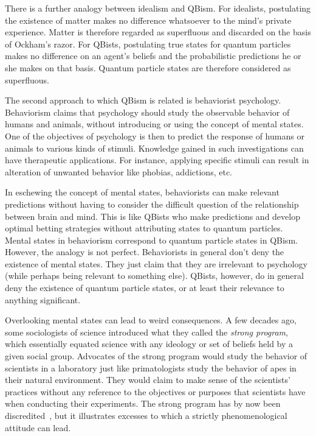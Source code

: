 \documentclass[12pt]{article}
\begin{document}
There is a further analogy between idealism
and QBism.  For idealists, postulating the
existence of matter makes no difference
whatsoever to the mind's private experience.
Matter is therefore regarded as superfluous
and discarded on the basis of Ockham's razor.
For QBists, postulating true states for
quantum particles makes no difference on
an agent's beliefs and the probabilistic
predictions he or she makes on that basis.
Quantum particle states are therefore
considered as superfluous.

The second approach to which QBism is
related is behaviorist psychology.
Behaviorism claims that psychology should
study the observable behavior of humans
and animals, without introducing or using
the concept of mental states.  One of the
objectives of psychology is then to predict
the response of humans or animals to various
kinds of stimuli.  Knowledge gained in such
investigations can have therapeutic
applications.  For instance, applying
specific stimuli can result in alteration
of unwanted behavior like phobias,
addictions, etc.

In eschewing the concept of mental states,
behaviorists can make relevant predictions
without having to consider the difficult
question of the relationship between brain
and mind.  This is like QBists who make
predictions and develop optimal betting
strategies without attributing states to
quantum particles.  Mental states in
behaviorism correspond to quantum particle
states in QBism.  However, the analogy is not
perfect.  Behaviorists in general don't deny
the existence of mental states.  They just
claim that they are irrelevant to psychology
(while perhaps being relevant to something
else).  QBists, however, do in general deny
the existence of quantum particle states, or
at least their relevance to anything
significant.

Overlooking mental states can lead to weird
consequences.  A few decades ago, some
sociologists of science introduced what they
called the \emph{strong program}, which
essentially equated science with any ideology
or set of beliefs held by a given social
group.  Advocates of the strong program
would study the behavior of scientists
in a laboratory just like primatologists
study the behavior of apes in their
natural environment.  They would claim to
make sense of the scientists' practices
without any reference to the objectives or
purposes that scientists have when conducting
their experiments.  The strong program has
by now been discredited~\cite{bunge}, but it
illustrates excesses to which a strictly
phenomenological attitude can lead.
%
\end{document}
